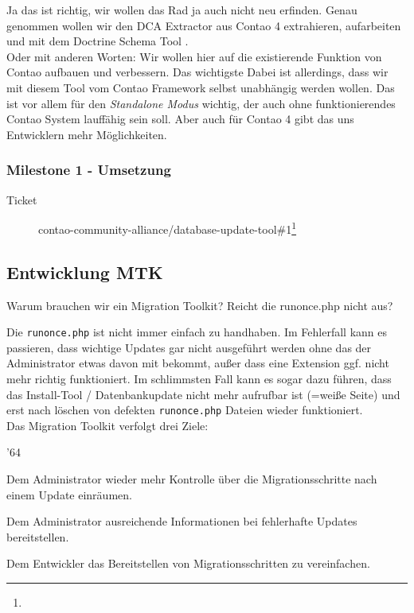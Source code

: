 \documentclass[
paper=a4,
draft=false,%
fontsize=10pt%
]{scrartcl}
\begin{document}
Ja das ist richtig, wir wollen das Rad ja auch nicht neu erfinden. Genau genommen wollen wir den DCA Extractor aus Contao 4 extrahieren, aufarbeiten und mit dem Doctrine Schema Tool .\\
Oder mit anderen Worten: Wir wollen hier auf die existierende Funktion von Contao aufbauen und verbessern. Das wichtigste Dabei ist allerdings, dass wir mit diesem Tool vom Contao Framework selbst unabhängig werden wollen. Das ist vor allem für den \textit{Standalone Modus} wichtig, der auch ohne funktionierendes Contao System lauffähig sein soll. Aber auch für Contao 4 gibt das uns Entwicklern mehr Möglichkeiten.

\subsubsection{Milestone 1 - Umsetzung}
\label{subsec:dut-milestone-1}

\begin{description}
\item[Ticket] contao-community-alliance/database-update-tool\#1\footnote{}
\end{description}

\subsection{Entwicklung MTK}
\label{subsec:mtk}

\begin{emquotation}
Warum brauchen wir ein Migration Toolkit? Reicht die runonce.php nicht aus?
\end{emquotation}

Die \texttt{runonce.php} ist nicht immer einfach zu handhaben. Im Fehlerfall kann es passieren, dass wichtige Updates gar nicht ausgeführt werden ohne das der Administrator etwas davon mit bekommt, außer dass eine Extension ggf. nicht mehr richtig funktioniert. Im schlimmsten Fall kann es sogar dazu führen, dass das Install-Tool / Datenbankupdate nicht mehr aufrufbar ist (=weiße Seite) und erst nach löschen von defekten \texttt{runonce.php} Dateien wieder funktioniert.\\
Das Migration Toolkit verfolgt drei Ziele:

\begin{dinglist}{'64}
\item Dem Administrator wieder mehr Kontrolle über die Migrationsschritte nach einem Update einräumen.
\item Dem Administrator ausreichende Informationen bei fehlerhafte Updates bereitstellen.
\item Dem Entwickler das Bereitstellen von Migrationsschritten zu vereinfachen.
\end{dinglist}
\end{document}
